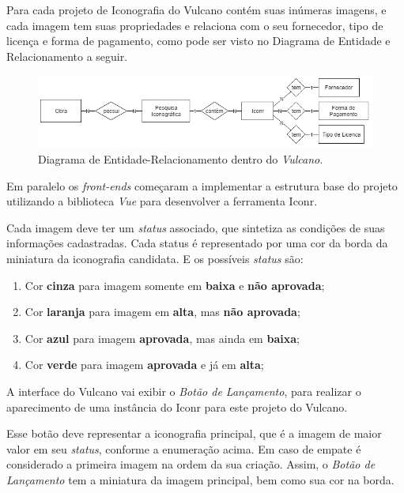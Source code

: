 \documentclass[
  12pt,            %
  openany,
  oneside,
  a4paper,         %
  english,      %
  brazil
]{article}
\numberwithin{figure}{section}
\numberwithin{table}{section}
\begin{document}
Para cada projeto de Iconografia do Vulcano contém suas inúmeras imagens, e cada imagem tem suas propriedades e relaciona com o seu fornecedor, tipo de licença e forma de pagamento, como pode ser visto no Diagrama de Entidade e Relacionamento a seguir.

\begin{figure}[H]
  \centering
  \includegraphics[width=\linewidth]{iconr_der}
  \vspace{-10mm}
  \caption{Diagrama de Entidade-Relacionamento dentro do \textit{Vulcano}.}
  \label{fig:iconr:der}
\end{figure}

Em paralelo os \textit{front-ends} começaram a implementar a estrutura base do projeto utilizando a biblioteca \textit{Vue} para desenvolver a ferramenta Iconr.

Cada imagem deve ter um \textit{status} associado, que sintetiza as condições de suas informações cadastradas. Cada status é representado por uma cor da borda da miniatura da iconografia candidata. E os possíveis \textit{status} são:

\vspace{-10mm}
\begin{singlespace}
  \begin{enumerate}
    \item Cor \textbf{cinza} para imagem somente em \textbf{baixa} e \textbf{não aprovada};
    \item Cor \textbf{laranja} para imagem em \textbf{alta}, mas \textbf{não aprovada};
    \item Cor \textbf{azul} para imagem \textbf{aprovada}, mas ainda em \textbf{baixa};
    \item Cor \textbf{verde} para imagem \textbf{aprovada} e já em \textbf{alta};
  \end{enumerate}
\end{singlespace}
\vspace{-5mm}

A interface do Vulcano vai exibir o \textit{Botão de Lançamento}, para realizar o aparecimento de uma instância do Iconr para este projeto do Vulcano.

Esse botão deve representar a iconografia principal, que é a imagem de maior valor em seu \textit{status}, conforme a enumeração acima. Em caso de empate é considerado a primeira imagem na ordem da sua criação. Assim, o \textit{Botão de Lançamento} tem a miniatura da imagem principal, bem como sua cor na borda.
\end{document}
